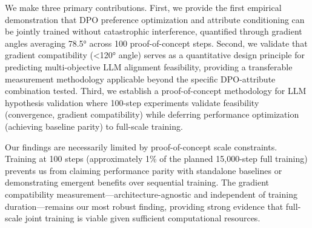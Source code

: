 We make three primary contributions. First, we provide the first empirical demonstration that DPO preference optimization and attribute conditioning can be jointly trained without catastrophic interference, quantified through gradient angles averaging 78.5° across 100 proof-of-concept steps. Second, we validate that gradient compatibility (<120° angle) serves as a quantitative design principle for predicting multi-objective LLM alignment feasibility, providing a transferable measurement methodology applicable beyond the specific DPO-attribute combination tested. Third, we establish a proof-of-concept methodology for LLM hypothesis validation where 100-step experiments validate feasibility (convergence, gradient compatibility) while deferring performance optimization (achieving baseline parity) to full-scale training.

Our findings are necessarily limited by proof-of-concept scale constraints. Training at 100 steps (approximately 1\% of the planned 15,000-step full training) prevents us from claiming performance parity with standalone baselines or demonstrating emergent benefits over sequential training. The gradient compatibility measurement---architecture-agnostic and independent of training duration---remains our most robust finding, providing strong evidence that full-scale joint training is viable given sufficient computational resources.
